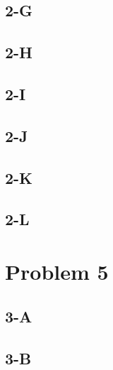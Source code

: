 \documentclass{article}
\begin{document}
        \subsection{2-G}
        \subsection{2-H}
        \subsection{2-I}
        \subsection{2-J}
        \subsection{2-K}
        \subsection{2-L}
    \section{Problem 5}
        \subsection{3-A}
        \subsection{3-B}
\end{document}
